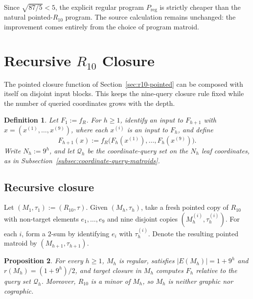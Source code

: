 \documentclass[11pt]{article}
\numberwithin{equation}{section}
\newtheorem{definition}{Definition}[section]
\newtheorem{proposition}[definition]{Proposition}
\theoremstyle{remark}
\begin{document}
Since $\sqrt{87/5}<5$, the explicit regular program $P_{\mathrm{reg}}$ is
strictly cheaper than the natural pointed-$R_{10}$ program. The source
calculation remains unchanged: the improvement comes entirely from the choice
of program matroid.

\section{Recursive \texorpdfstring{$R_{10}$}{R10} Closure}
\label{sec:r10-recursive}

The pointed closure function of Section~\ref{sec:r10-pointed} can be
composed with itself on disjoint input blocks. This keeps the nine-query
closure rule fixed while the number of queried coordinates grows with the
depth.

\begin{definition}
\label{def:recursive-r10-function}
Let $F_1:=f_R$.  For $h\geq1$, identify an input to $F_{h+1}$ with
$x=(x^{(1)},\ldots,x^{(9)})$, where each $x^{(i)}$ is an input to $F_h$, and
define
\begin{equation}
    F_{h+1}(x)
    :=
    f_R\bigl(F_h(x^{(1)}),\ldots,F_h(x^{(9)})\bigr).
\end{equation}
Write $N_h:=9^h$, and let $\mathcal Q_h$ be the coordinate-query set on
the $N_h$ leaf coordinates, as in Subsection~\ref{subsec:coordinate-query-matroids}.
\end{definition}

\subsection{Recursive closure}

Let $(M_1,\tau_1):=(R_{10},\tau)$.  Given $(M_h,\tau_h)$, take a fresh
pointed copy of $R_{10}$ with non-target elements $e_1,\ldots,e_9$ and nine
disjoint copies $(M_h^{(i)},\tau_h^{(i)})$.  For each $i$, form a $2$-sum by
identifying $e_i$ with $\tau_h^{(i)}$.  Denote the resulting pointed matroid
by $(M_{h+1},\tau_{h+1})$.

\begin{proposition}
\label{prop:recursive-r10-closure}
For every $h\geq1$, $M_h$ is regular, satisfies
$|E(M_h)|=1+9^h$ and $r(M_h)=(1+9^h)/2$, and target closure in $M_h$
computes $F_h$ relative to the query set $\mathcal Q_h$. Moreover, $R_{10}$ is
a minor of $M_h$, so $M_h$ is neither graphic nor cographic.
\end{proposition}
\end{document}

